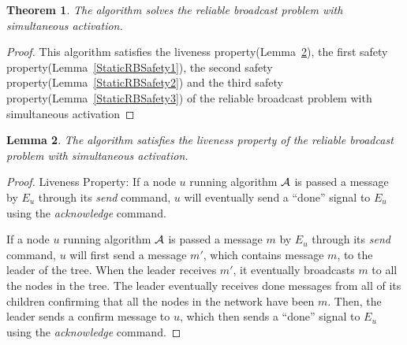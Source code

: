 \documentclass[english]{article}
\newtheorem{theorem}{Theorem}[section]
\newtheorem{lemma}[theorem]{Lemma}
\begin{document}
\begin{theorem}
\label{StaticReliableBroadcast}
The algorithm solves the reliable broadcast problem with simultaneous activation.
\end{theorem}
\begin{proof}
This algorithm satisfies the liveness property(Lemma~\ref{StaticRBLiveness}), 
the first safety property(Lemma~\ref{StaticRBSafety1}),
the second safety property(Lemma~\ref{StaticRBSafety2}) and 
the third safety property(Lemma~\ref{StaticRBSafety3}) of the reliable broadcast problem with simultaneous activation
\end{proof}


\begin{lemma}
\label{StaticRBLiveness}
The algorithm satisfies the liveness property of the reliable broadcast problem with simultaneous activation.
\end{lemma}
\begin{proof}
Liveness Property: If a node $u$ running algorithm $\cal A$ is passed a message by $E_u$ through its \textit{send} command, $u$ will eventually send  a ``done'' signal to $E_u$ using the \textit{acknowledge} command.

If a node $u$ running algorithm $\cal A$ is passed a message $m$ by $E_u$ through its \textit{send} command, $u$ will first send a message $m'$, which contains message $m$, to the leader of the tree. When the leader receives $m'$, it eventually broadcasts $m$ to all the nodes in the tree. The leader eventually receives done messages from all of its children confirming that all the nodes in the network have been $m$. Then, the leader sends a confirm message to $u$, which then sends  a ``done'' signal to $E_u$ using the \textit{acknowledge} command.
\end{proof}
\end{document}
